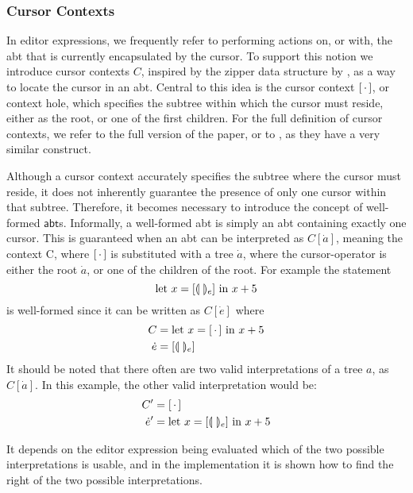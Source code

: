 \documentclass[sigplan]{acmart}
\newcommand{\abt}{\textsf{abt}\xspace}
\begin{document}
\subsubsection{Cursor Contexts}
In editor expressions, we frequently refer to performing actions on,
or with, the \abt that is currently encapsulated by the cursor. To
support this notion we introduce cursor contexts $C$, inspired by the
zipper data structure by \cite{huet_zipper}, as a way to locate the
cursor in an \abt. Central to this idea is the cursor context
$[ \, \cdot \, ]$, or context hole, which specifies the subtree within which
the cursor must reside, either as the root, or one of the first
children.  For the full definition of cursor contexts, we refer to the
full version of the paper, or to \cite{type_safe_structure_editor}, as
they have a very similar construct. 

Although a cursor context accurately specifies the subtree where the
cursor must reside, it does not inherently guarantee the presence of
only one cursor within that subtree. Therefore, it becomes necessary
to introduce the concept of well-formed $\abt$s. Informally, a
well-formed \abt is simply an \abt containing exactly one cursor. This
is guaranteed when an \abt can be interpreted as $C[\dot{a}]$, meaning
the context C, where $[ \, \cdot \, ]$ is substituted with a tree $\dot{a}$,
where the cursor-operator is either the root $\dot{a}$, or one of the
children of the root. For example the statement 
    \begin{equation*}
        \text{let $x=[\llparenthesis \ \rrparenthesis_e]$ in $x+5$}
    \end{equation*}
    is well-formed since it can be written as $C[\dot{e}]$ where
    \begin{align*}
        C &= \text{let $x=[ \, \cdot \, ]$ in $x+5$} \\
        \dot{e}&= [\llparenthesis \ \rrparenthesis_e]
    \end{align*}
%
It should be noted that there often are two valid interpretations of a
tree $a$, as $C[\dot{a}]$. In this example, the other valid
interpretation would be: 
%
\begin{align*}
        C' &= [ \, \cdot \, ] \\
        \dot{e}' &= \text{let $x=[\llparenthesis \ \rrparenthesis_e]$ in $x+5$}
\end{align*}

It depends on the editor expression being evaluated which of the two
possible interpretations is usable, and in the implementation it is
shown how to find the right of the two possible interpretations.
\end{document}

